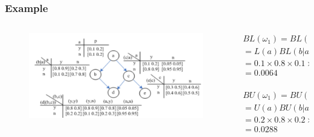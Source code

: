 \documentclass{beamer}
\begin{document}
\begin{frame}
\frametitle{Example}
    \begin{columns}
\begin{column}{0.5\textwidth}
\begin{figure}
\begin{flushleft}
\includegraphics[scale = 0.245]{Figures/Example.png}
\end{flushleft}
\end{figure}
\end{column}
\begin{column}{0.5\textwidth}
{\small
\begin{align}
    BL(\omega_1) = BL(abcd)\\
    = L(a)BL(b|a)BL(c|a)BL(d|bc)\\
    = 0.1 \times 0.8 \times 0.1 \times 0.8 \\
    = 0.0064
    \end{align}\
    \begin{align}
        BU(\omega_1) = BU(abcd)\\
    = U(a)BU(b|a)BU(c|a)BU(d|bc)\\
    = 0.2 \times 0.8 \times 0.2 \times 0.9 \\
    = 0.0288
\end{align}
}
\end{column}
\end{columns}
\end{frame}
\end{document}
